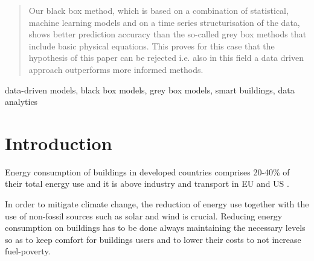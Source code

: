 \documentclass[10pt, conference, compsocconf]{IEEEtran}
\begin{document}
\begin{abstract}

Our black box method, which is based on a combination of statistical, machine learning models and on a time series structurisation of the data, shows better prediction accuracy than the so-called grey box methods that include basic physical equations. This proves for this case that the hypothesis of this paper can be rejected i.e. also in this field a data driven approach outperforms more informed methods.

\end{abstract}

\begin{IEEEkeywords}
data-driven models, black box models, grey box models, smart buildings, data analytics

\end{IEEEkeywords}


%
\IEEEpeerreviewmaketitle



\section{Introduction} \label{intro}

Energy consumption of buildings in developed countries comprises 20-40\% of their total energy use and it is above industry and transport in EU and US \cite{perez2008review}. 

In order to mitigate climate change, the reduction of energy use together with the use of non-fossil sources such as solar and wind is crucial. Reducing energy consumption on buildings has to be done always maintaining the necessary levels so as to keep comfort for buildings users and to lower their costs to not increase fuel-poverty.
\end{document}
